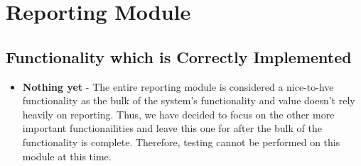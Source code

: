 \documentclass[11pt,fleqn]{book} %
\begin{document}
	\section{Reporting Module}
		\subsection{Functionality which is Correctly Implemented}
			\begin{itemize}
				\item\textbf{Nothing yet} -
				The entire reporting module is considered a nice-to-hve functionality as the bulk of the system's functionality and value doesn't rely heavily on reporting. Thus, we have decided to focus on the other more important functionailities and leave this one for after the bulk of the functionality is complete. Therefore, testing cannot be performed on this module at this time.
			\end{itemize}
%				
%				
%				
			
\end{document}
